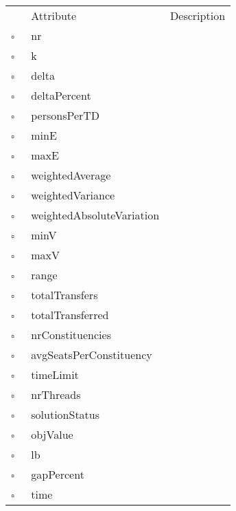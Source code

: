 \clearpage
\begin{table}
\caption{Solution  }

\begin{longtable}{llp{8cm}}
& Attribute & Description \\
$\square$\ & nr &  \\
$\square$\ & k &  \\
$\square$\ & delta &  \\
$\square$\ & deltaPercent &  \\
$\square$\ & personsPerTD &  \\
$\square$\ & minE &  \\
$\square$\ & maxE &  \\
$\square$\ & weightedAverage &  \\
$\square$\ & weightedVariance &  \\
$\square$\ & weightedAbsoluteVariation &  \\
$\square$\ & minV &  \\
$\square$\ & maxV &  \\
$\square$\ & range &  \\
$\square$\ & totalTransfers &  \\
$\square$\ & totalTransferred &  \\
$\square$\ & nrConstituencies &  \\
$\square$\ & avgSeatsPerConstituency &  \\
$\square$\ & timeLimit &  \\
$\square$\ & nrThreads &  \\
$\square$\ & solutionStatus &  \\
$\square$\ & objValue &  \\
$\square$\ & lb &  \\
$\square$\ & gapPercent &  \\
$\square$\ & time &  \\
\end{longtable}
\label{attr:Solution}
\end{table}
